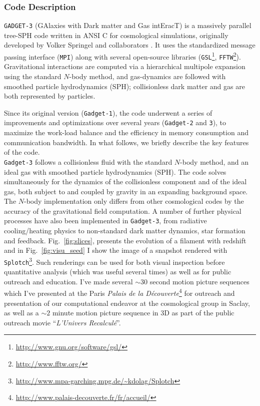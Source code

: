 \subsubsection{Code Description}
\label{sec:gadget_description}
\texttt{GADGET-3} (GAlaxies with Dark matter and Gas intEracT) is a massively parallel tree-SPH code written in ANSI C for cosmological simulations, originally developed by Volker Springel and collaborators \citep{Springel2001,Springel2005}. It uses the standardized message passing interface (\texttt{MPI}) along with several open-source libraries (\texttt{GSL}\footnote{\url{http://www.gnu.org/software/gsl/}}, \texttt{FFTW}\footnote{\url{http://www.fftw.org/}}). Gravitational interactions are computed via a hierarchical multipole expansion using the standard $N$-body method, and gas-dynamics are followed with smoothed particle
hydrodynamics (SPH); collisionless dark matter and gas are both represented by particles. 

Since its original version (\texttt{Gadget-1}), the code underwent a series of improvements and 
optimizations over several years (\texttt{Gadget-2} and \texttt{3}), to maximize the work-load balance and the efficiency in memory consumption and communication bandwidth. In what follows, we briefly describe the key features of the code. \\

\texttt{Gadget-3} follows a collisionless fluid with the standard $N$-body method, and an ideal gas with smoothed particle hydrodynamics (SPH). The code solves simultaneously for the dynamics of the collisionless component and of the ideal gas, both subject to and coupled by gravity in an expanding background space. The $N$-body implementation only differs from other cosmological codes by the accuracy of the gravitational field computation. A number of further physical processes have also been implemented in \texttt{Gadget-3}, from radiative cooling/heating physics to non-standard dark matter dynamics, star formation and feedback. Fig.~\ref{fig:slices}, presents the evolution of a filament with redshift and in Fig.~\ref{fig:visu_seed} I show the image of a snapshot rendered with \texttt{Splotch}\footnote{\url{http://www.mpa-garching.mpg.de/~kdolag/Splotch}}. Such renderings can be used for both visual inspection before
quantitative analysis (which was useful several times) as well as for public outreach and education. I've made several $\sim 30$ second motion picture sequences which I've presented at the Paris \textit{Palais de la D\'ecouverte}\footnote{\url{http://www.palais-decouverte.fr/fr/accueil/}} for outreach and presentation of our computational endeavor at the cosmological group in Saclay, as well as a $\sim 2$ minute motion picture sequence in 3D as part of the public outreach movie ``\textit{L'Univers Recalcul\'e}''.\\


